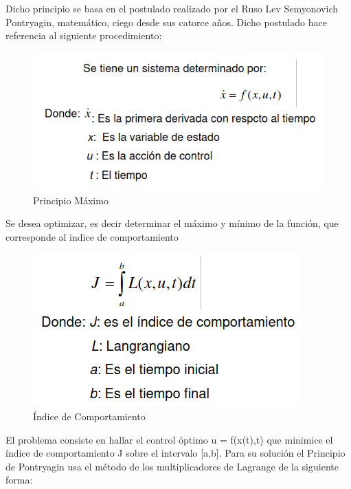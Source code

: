 \documentclass[12pt,letterpaper]{article}
\begin{document}
Dicho principio se basa en el postulado realizado por el Ruso Lev Semyonovich Pontryagin, matemático, ciego desde sus catorce años. Dicho postulado hace referencia al siguiente procedimiento:
\cite{Mariano} 
\begin{figure}[H]
    \centering
    \includegraphics[scale=0.55]{EL5841_reporte/im05.png}
    \caption{Principio Máximo \cite{Mariano} } 
    \label{fig:MV4}
\end{figure}
Se desea optimizar, es decir determinar el máximo y mínimo de la función, que corresponde al indice de comportamiento 
\begin{figure}[H]
    \centering
    \includegraphics[scale=0.55]{EL5841_reporte/im07.png}
    \caption{Índice de Comportamiento \cite{Mariano}   }
    \label{fig:MV4}
\end{figure}
El problema consiste en hallar el control óptimo u = f(x(t),t) que minimice el índice de comportamiento J sobre el intervalo [a,b].\cite{Mariano} Para su solución el Principio de Pontryagin usa el método de los multiplicadores de Lagrange de la siguiente forma:
\end{document}
